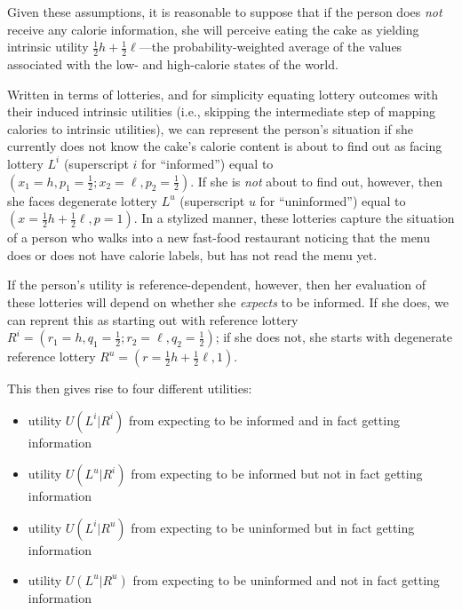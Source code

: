 \documentclass[11pt,reqno]{amsart}
\newcommand{\half}{\tfrac{1}{2}}
\begin{document}
Given these assumptions, it is reasonable to suppose that if the person does
{\em not} receive any calorie information, she will perceive eating the cake
as yielding intrinsic utility $\half h + \half \ell$---the
probability-weighted average of the values associated with the low- and
high-calorie states of the world. 

Written in terms of lotteries, and for simplicity equating lottery outcomes
with their induced intrinsic utilities (i.e., skipping the intermediate step
of mapping calories to intrinsic utilities), we can represent the person's
situation if she currently does not know the cake's calorie content is about
to find out as facing lottery $L^i$ (superscript $i$ for ``informed'') equal
to $(x_1 = h,p_1 = \half;x_2 = \ell,p_2 = \half)$. If she is {\em not} about
to find out, however, then she faces degenerate lottery $L^u$ (superscript $u$
for ``uninformed'') equal to $(x = \half h + \half\ell, p = 1)$. In a stylized
manner, these lotteries capture the situation of a person who walks into a new
fast-food restaurant noticing that the menu does or does not have calorie
labels, but has not read the menu yet. 

If the person's utility is reference-dependent, however, then her evaluation
of these lotteries will depend on whether she {\em expects} to be informed. If
she does, we can reprent this as starting out with reference lottery $R^i =
(r_1 = h,q_1 = \half;r_2 = \ell,q_2 = \half)$; if she does not, she starts
with degenerate reference lottery $R^u = (r = \half h + \half\ell, 1)$. 

This then gives rise to four different utilities:
\begin{itemize}
  \item utility $U(L^i|R^i)$ from expecting to be informed and in
    fact getting information
  \item utility $U(L^u|R^i)$ from expecting to be informed but 
    not in fact getting information
  \item utility $U(L^i|R^u)$ from expecting to be uninformed
    but in fact getting information
  \item utility $U(L^u|R^u)$ from expecting to be uninformed 
    and not in fact getting information
\end{itemize}
\end{document}
